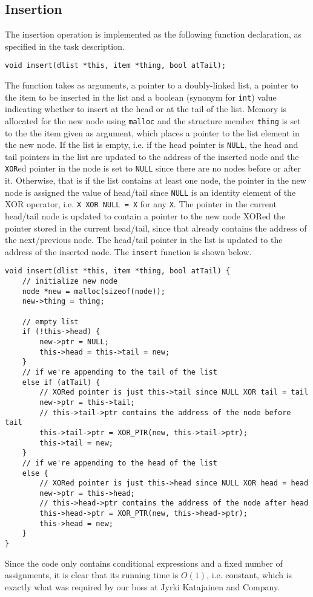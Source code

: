 \documentclass[11pt]{article}
\newcommand{\code}[1]{{\tt #1}}
\begin{document}
\subsection{Insertion}
The insertion operation is implemented as the following function declaration, as
specified in the task description.
\begin{lstlisting}
void insert(dlist *this, item *thing, bool atTail);
\end{lstlisting}
The function takes as arguments, a pointer to a doubly-linked list, a pointer to
the item to be inserted in the list and a boolean (synonym for \code{int}) value
indicating whether to insert at the head or at the tail of the list.
Memory is allocated for the new node using \code{malloc} and the structure
member \code{thing} is set to the the item given as argument, which places a
pointer to the list element in the new node. If the list is empty, i.e. if the
head pointer is \code{NULL}, the head and tail pointers in the list are updated
to the address of the inserted node and the \verb|XOR|ed pointer in the node is set to
\code{NULL} since there are no nodes before or after it. Otherwise, that is if
the list contains at least one node, the pointer in the new node is assigned the
value of head/tail since \code{NULL} is an identity element of the XOR operator,
i.e. \verb|X XOR NULL = X| for any \verb|X|. The pointer in the current
head/tail node is updated to contain a pointer to the new node XORed the pointer
stored in the current head/tail, since that already contains the address of the
next/previous node. The head/tail pointer in the list is updated to the address
of the inserted node. The \code{insert} function is shown below.
\begin{lstlisting}
void insert(dlist *this, item *thing, bool atTail) {
    // initialize new node
    node *new = malloc(sizeof(node));
    new->thing = thing;

    // empty list
    if (!this->head) {
        new->ptr = NULL;
        this->head = this->tail = new;
    }
    // if we're appending to the tail of the list
    else if (atTail) {
        // XORed pointer is just this->tail since NULL XOR tail = tail
        new->ptr = this->tail;
        // this->tail->ptr contains the address of the node before tail
        this->tail->ptr = XOR_PTR(new, this->tail->ptr);
        this->tail = new;
    }
    // if we're appending to the head of the list
    else {
        // XORed pointer is just this->head since NULL XOR head = head
        new->ptr = this->head;
        // this->head->ptr contains the address of the node after head
        this->head->ptr = XOR_PTR(new, this->head->ptr);
        this->head = new;
    }
}
\end{lstlisting}
Since the code only contains conditional expressions and a fixed number of
assignments, it is clear that its running time is \(O(1)\), i.e. constant, which
is exactly what was required by our boss at Jyrki Katajainen and Company.
\end{document}
